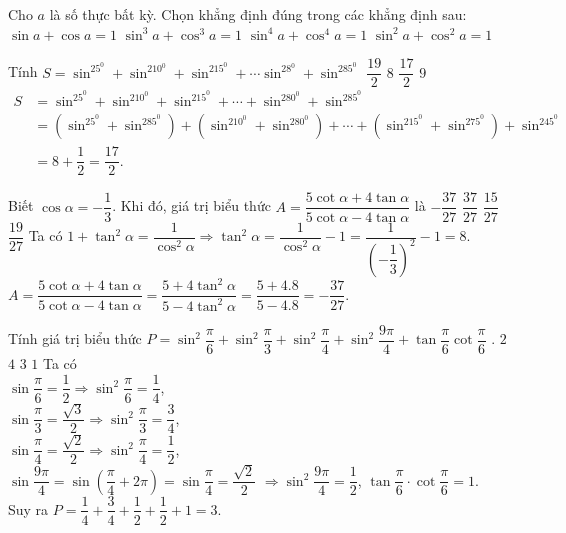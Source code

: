 \begin{ex}%
	Cho $ a$ là số thực bất kỳ. Chọn khẳng định đúng trong các khẳng định sau:
	\choice
	{$\sin a+\cos a=1$}
	{$\sin^3a+\cos^3a=1$}
	{$\sin^4a+\cos^4a=1$}
	{\True $\sin^2a+\cos^2a=1$}
\end{ex}




\begin{ex}%
	Tính $S=\sin^25^0+\sin^210^0+\sin^215^0+ \cdots \sin^28^0+\sin^285^0$ 
	\choice
	{$\dfrac{19}{2}$}
	{$ 8$}
	{\True $\dfrac{17}{2}$}
	{$ 9$}
	\loigiai
	{	$\begin{aligned}
		S&=\sin^25^0+\sin^210^0+\sin^215^0+\cdots +\sin^280^0+\sin^285^0\\
		&=\left(\sin^25^0+\sin^285^0\right)+\left(\sin^210^0+\sin^280^0\right)+ \cdots + \left(\sin^215^0+\sin^275^0\right)+\sin^245^0\\
		&=8+\dfrac{1}{2}=\dfrac{17}{2}.
		\end{aligned}
	$
		}
\end{ex}





\begin{ex}%
	Biết $\cos\alpha=-\dfrac{1}{3}$. Khi đó, giá trị biểu thức $ A=\dfrac{5\cot\alpha+4\tan\alpha}{5\cot\alpha-4\tan\alpha}$ là
	\choice
	{\True $-\dfrac{37}{27}$}
	{$\dfrac{37}{27}$}
	{$\dfrac{15}{27}$}
	{$\dfrac{19}{27}$}
	\loigiai
	{Ta có $ 1+\tan^2\alpha=\dfrac{1}{\cos^2\alpha}\Rightarrow{\tan^2}\alpha=\dfrac{1}{\cos^2\alpha}-1=\dfrac{1}{\left(-\dfrac{1}{3}\right)^2}-1=8$.\\
		$ A=\dfrac{5\cot\alpha+4\tan\alpha}{5\cot\alpha-4\tan\alpha}=\dfrac{5+4\tan^2\alpha}{5-4\tan^2\alpha}=\dfrac{5+4.8}{5-4.8}=-\dfrac{37}{27}$.}
\end{ex}





\begin{ex}%
	Tính giá trị biểu thức $P=\sin^2\dfrac{\pi}{6}+\sin^2\dfrac{\pi}{3}+\sin^2\dfrac{\pi}{4}+\sin^2\dfrac{9\pi}{4}+\tan\dfrac{\pi}{6}\cot\dfrac{\pi}{6}$ .
	\choice
	{$2$}
	{$4$}
	{\True $3$}
	{$1$}
	\loigiai
	{Ta có \\
		$\sin\dfrac{\pi}{6}=\dfrac{1}{2}\Rightarrow{\sin^2}\dfrac{\pi}{6}=\dfrac{1}{4}$, \\ $\sin\dfrac{\pi}{3}=\dfrac{\sqrt{3}}{2}\Rightarrow{\sin^2}\dfrac{\pi}{3}=\dfrac{3}{4}$, \\ $\sin\dfrac{\pi}{4}=\dfrac{\sqrt{2}}{2}\Rightarrow{\sin^2}\dfrac{\pi}{4}=\dfrac{1}{2}$,\\
		$\sin\dfrac{9\pi}{4}=\sin\left(\dfrac{\pi}{4}+2\pi\right)=\sin\dfrac{\pi}{4}=\dfrac{\sqrt{2}}{2}$ $\Rightarrow{\sin^2}\dfrac{9\pi}{4}=\dfrac{1}{2}$, $\tan\dfrac{\pi}{6}\cdot \cot\dfrac{\pi}{6}=1$.\\
		Suy ra $P=\dfrac{1}{4}+\dfrac{3}{4}+\dfrac{1}{2}+\dfrac{1}{2}+1=3$.}
\end{ex}



